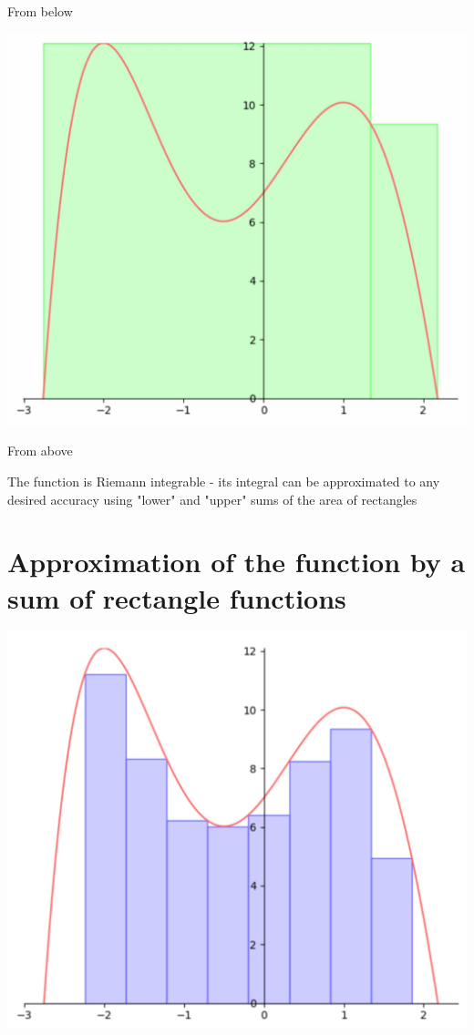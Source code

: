 \documentclass[10pt]{article}
\begin{document}
From below

\begin{center}
\includegraphics[max width=\textwidth]{2024_01_08_0e0dcffe4bc8c6049046g-21}
\end{center}

From above

The function is Riemann integrable - its integral can be approximated to any desired accuracy using "lower" and "upper" sums of the area of rectangles

\section*{Approximation of the function by a sum of rectangle functions}
\begin{center}
\includegraphics[max width=\textwidth]{2024_01_08_0e0dcffe4bc8c6049046g-22}
\end{center}
\end{document}

